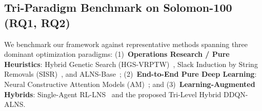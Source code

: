\documentclass{ieeeaccess}
\begin{document}
\subsection{Tri-Paradigm Benchmark on Solomon-100 (RQ1, RQ2)}
\label{sec:solomon_results}

We benchmark our framework against representative methods spanning three dominant optimization paradigms: (1)~\textbf{Operations Research / Pure Heuristics}: Hybrid Genetic Search (HGS-VRPTW)~\cite{vidal2013hybrid}, Slack Induction by String Removals (SISR)~\cite{christiaens2020slack}, and ALNS-Base~\cite{pisinger2007general}; (2)~\textbf{End-to-End Pure Deep Learning}: Neural Constructive Attention Models (AM)~\cite{kool2019attention,lin2021neural}; and (3)~\textbf{Learning-Augmented Hybrids}: Single-Agent RL-LNS~\cite{lu2020learning,son2023learning} and the proposed Tri-Level Hybrid DDQN-ALNS.
\end{document}
